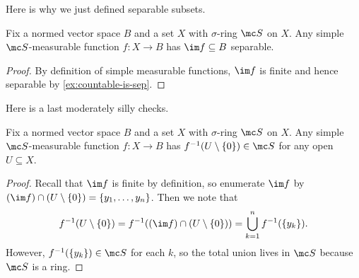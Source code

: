 \documentclass[../notes.tex]{subfiles}
\begin{document}
Here is why we just defined separable subsets.
\begin{lemma} \label{lem:simple-has-sep-image}
	Fix a normed vector space $B$ and a set $X$ with $\sigma$-ring $\mc S$ on $X$. Any simple $\mc S$-measurable function $f\colon X\to B$ has $\im f\subseteq B$ separable.
\end{lemma}
\begin{proof}
	By definition of simple measurable functions, $\im f$ is finite and hence separable by \autoref{ex:countable-is-sep}.
\end{proof}
Here is a last moderately silly checks.
\begin{lemma} \label{lem:simple-measurable-pre-image}
	Fix a normed vector space $B$ and a set $X$ with $\sigma$-ring $\mc S$ on $X$. Any simple $\mc S$-measurable function $f\colon X\to B$ has $f^{-1}(U\setminus\{0\})\in\mc S$ for any open $U\subseteq X$.
\end{lemma}
\begin{proof}
	Recall that $\im f$ is finite by definition, so enumerate $\im f$ by $(\im f)\cap(U\setminus\{0\})=\{y_1,\ldots,y_n\}$. Then we note that
	\[f^{-1}(U\setminus\{0\})=f^{-1}((\im f)\cap(U\setminus\{0\}))=\bigcup_{k=1}^nf^{-1}(\{y_k\}).\]
	However, $f^{-1}(\{y_k\})\in\mc S$ for each $k$, so the total union lives in $\mc S$ because $\mc S$ is a ring.
\end{proof}
\end{document}
